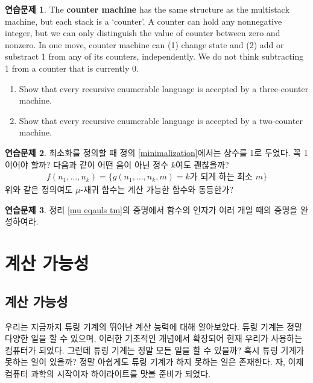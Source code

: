 \documentclass[b5paper, 11pt]{book}
\theoremstyle{definition}
\newtheorem{ec}{연습문제}[chapter]
\begin{document}
\begin{ec}
    The \textbf{counter machine} has the same structure as the multistack machine, 
    but each stack is a `counter'. A counter can hold any nonnegative integer, but 
    we can only distinguish the value of counter between zero and nonzero. In one
     move, counter machine can (1) change state and (2) add or substract 1 from any
      of its counters, independently. We do not think subtracting 1 from a counter 
      that is currently 0. 
      \begin{enumerate}
        \item Show that every recursive enumerable language is accepted by 
        a three-counter machine.
        \item Show that every recursive enumerable language is accepted by 
        a two-counter machine.
      \end{enumerate}
\end{ec}
\begin{ec}
    최소화를 정의할 때 정의 \ref{minimalization}에서는 상수를 1로 두었다. 꼭 1이어야 할까? 다음과 같이 어떤 음이 아닌 정수 $k$여도 괜찮을까?
    \begin{align*}
        f(n_1, \ldots, n_k) = \{g(n_1, \ldots, n_k, m) = k\text{가 되게 하는 최소 } m\}
    \end{align*}
    위와 같은 정의여도 $\mu$-재귀 함수는 계산 가능한 함수와 동등한가?
\end{ec}
\begin{ec}\label{several mu}
    정리 \ref{mu eqauls tm}의 증명에서 함수의 인자가 여러 개일 때의 증명을 완성하여라.
\end{ec}
\part{계산 가능성}
\chapter{계산 가능성}\label{computability}
우리는 지금까지 튜링 기계의 뛰어난 계산 능력에 대해 알아보았다. 튜링 기계는 정말 다양한 일을 할 수 있으며,
이러한 기초적인 개념에서 확장되어 현재 우리가 사용하는 컴퓨터가 되었다. 그런데 튜링 기계는 정말 모든 일을
할 수 있을까? 혹시 튜링 기계가 못하는 일이 있을까? 정말 아쉽게도 튜링 기계가 하지 못하는 일은 존재한다.
자, 이제 컴퓨터 과학의 시작이자 하이라이트를 맛볼 준비가 되었다.
\end{document}
